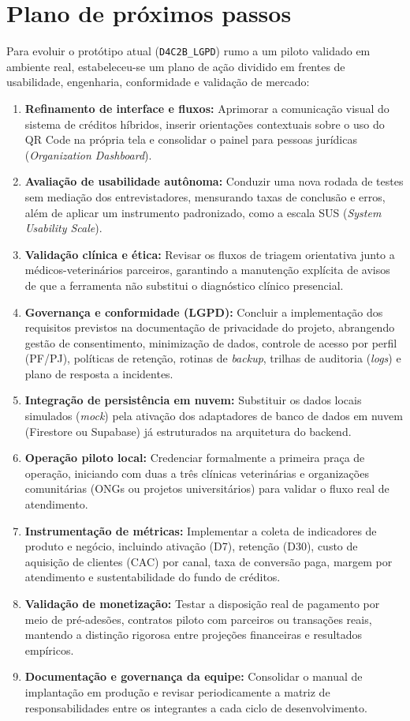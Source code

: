 \documentclass[12pt,a4paper]{article}
\begin{document}
\section{Plano de próximos passos}
Para evoluir o protótipo atual (\texttt{D4C2B\_LGPD}) rumo a um piloto validado em ambiente real, estabeleceu-se um plano de ação dividido em frentes de usabilidade, engenharia, conformidade e validação de mercado:

\begin{enumerate}[leftmargin=*]
  \item \textbf{Refinamento de interface e fluxos:} Aprimorar a comunicação visual do sistema de créditos híbridos, inserir orientações contextuais sobre o uso do QR Code na própria tela e consolidar o painel para pessoas jurídicas (\textit{Organization Dashboard}).
  \item \textbf{Avaliação de usabilidade autônoma:} Conduzir uma nova rodada de testes sem mediação dos entrevistadores, mensurando taxas de conclusão e erros, além de aplicar um instrumento padronizado, como a escala SUS (\textit{System Usability Scale}).
  \item \textbf{Validação clínica e ética:} Revisar os fluxos de triagem orientativa junto a médicos-veterinários parceiros, garantindo a manutenção explícita de avisos de que a ferramenta não substitui o diagnóstico clínico presencial.
  \item \textbf{Governança e conformidade (LGPD):} Concluir a implementação dos requisitos previstos na documentação de privacidade do projeto, abrangendo gestão de consentimento, minimização de dados, controle de acesso por perfil (PF/PJ), políticas de retenção, rotinas de \textit{backup}, trilhas de auditoria (\textit{logs}) e plano de resposta a incidentes.
  \item \textbf{Integração de persistência em nuvem:} Substituir os dados locais simulados (\textit{mock}) pela ativação dos adaptadores de banco de dados em nuvem (Firestore ou Supabase) já estruturados na arquitetura do backend.
  \item \textbf{Operação piloto local:} Credenciar formalmente a primeira praça de operação, iniciando com duas a três clínicas veterinárias e organizações comunitárias (ONGs ou projetos universitários) para validar o fluxo real de atendimento.
  \item \textbf{Instrumentação de métricas:} Implementar a coleta de indicadores de produto e negócio, incluindo ativação (D7), retenção (D30), custo de aquisição de clientes (CAC) por canal, taxa de conversão paga, margem por atendimento e sustentabilidade do fundo de créditos.
  \item \textbf{Validação de monetização:} Testar a disposição real de pagamento por meio de pré-adesões, contratos piloto com parceiros ou transações reais, mantendo a distinção rigorosa entre projeções financeiras e resultados empíricos.
  \item \textbf{Documentação e governança da equipe:} Consolidar o manual de implantação em produção e revisar periodicamente a matriz de responsabilidades entre os integrantes a cada ciclo de desenvolvimento.
\end{enumerate}
\end{document}
